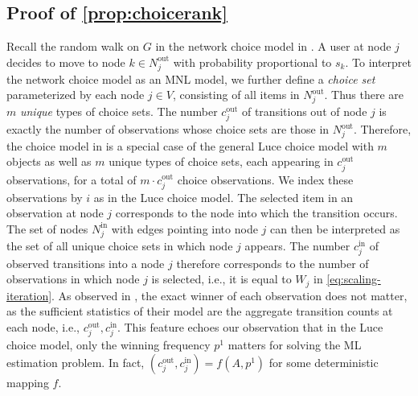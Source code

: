 \subsection{Proof of \cref{prop:choicerank}}
Recall the random walk on
$G$  in the network choice model in \citet{maystre2017choicerank}. A user at node $j$ decides to move to node $k\in N_{j}^{\text{out}}$ with probability proportional to $s_{k}$.
To interpret the network choice model as an MNL model, we further define a \emph{choice set} parameterized by each node $j\in V$, consisting of
all items in $N_{j}^{\text{out}}$. Thus there are $m$ \emph{unique} types of choice sets. The number $c_{j}^{\text{out}}$ of transitions
out of node $j$ is exactly the number of observations whose choice sets are those in $N_{j}^{\text{out}}$.  
Therefore, the choice model in \citet{maystre2017choicerank} is a special case of the general Luce choice model with $m$ objects as well as $m$ unique types of choice sets, each appearing in $c_{j}^{\text{out}}$ observations, for a total of $m\cdot c_{j}^{\text{out}}$ choice observations. We index these observations by $i$ as in the Luce choice model. The selected item in an observation at node $j$ corresponds to the node 
into which the transition occurs. The set of nodes $N_{j}^{\text{in}}$
with edges pointing into node $j$ can then be interpreted as the set of all unique choice sets in which node $j$ appears. The number $c_{j}^{\text{in}}$ of observed transitions into a node
$j$ therefore corresponds to the number of observations in which
node $j$ is selected, i.e., it is equal to $W_{j}$ in \eqref{eq:scaling-iteration}. As observed in \citet{maystre2017choicerank}, the exact winner of each observation does not matter, as the sufficient statistics of their model are the aggregate transition counts at each node, i.e., $c_{j}^{\text{out}}, c_{j}^{\text{in}}$. This feature echoes our observation that in the Luce choice model, only the winning frequency $p^1$ matters for solving the ML estimation problem. In fact, $(c_{j}^{\text{out}}, c_{j}^{\text{in}}) = f(A,p^1)$ for some deterministic mapping $f$. 

